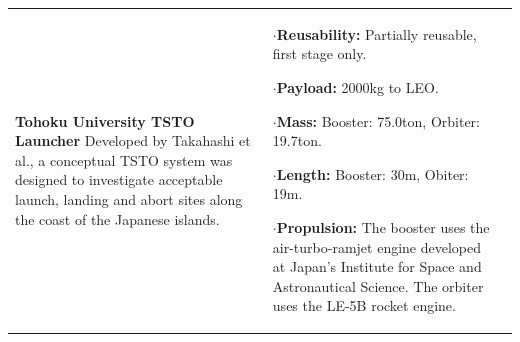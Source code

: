 {\begin{landscape}
\begin{xltabular}{\linewidth}{|X|X|X|}
	\\
	\hline \small 
	\textbf{Tohoku University TSTO Launcher}\cite{Takahashi1997}\newline\newline
	Developed by Takahashi et al.\cite{Takahashi1997}, a conceptual TSTO system was designed to investigate acceptable launch, landing and abort sites along the coast of the Japanese islands. 
	&\small
	
	$\cdot$\textbf{Reusability:} Partially reusable, first stage only. 
	
	$\cdot$\textbf{Payload:} 2000kg to LEO. 
	
	$\cdot$\textbf{Mass:} Booster: 75.0ton, Orbiter: 19.7ton.
	
	$\cdot$\textbf{Length:} Booster: 30m,  Obiter: 19m.
	
	$\cdot$\textbf{Propulsion:} The booster uses the air-turbo-ramjet engine developed at Japan's Institute for Space and Astronautical Science. The orbiter uses the LE-5B rocket engine. 
	

\end{xltabular}
\end{landscape}}
